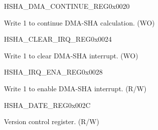 \begin{register}{H}{SHA\_DMA\_CONTINUE\_REG}{0x0020}\label{regdesc:SHADMACONTINUEREG}
%
%
\regnewline%
\begin{regdesc}\begin{reglist}
\label{fielddesc:SHADMACONTINUE}\item [SHA\_DMA\_CONTINUE] Write 1 to continue DMA-SHA calculation. (WO)
\end{reglist}\end{regdesc}
\end{register}


\begin{register}{H}{SHA\_CLEAR\_IRQ\_REG}{0x0024}\label{regdesc:SHACLEARIRQREG}
%
%
\regnewline%
\begin{regdesc}\begin{reglist}
\label{fielddesc:SHACLEARINTERRUPT}\item [SHA\_CLEAR\_INTERRUPT] Write 1 to clear DMA-SHA interrupt. (WO)
\end{reglist}\end{regdesc}
\end{register}


\begin{register}{H}{SHA\_IRQ\_ENA\_REG}{0x0028}\label{regdesc:SHAIRQENAREG}
%
%
\regnewline%
\begin{regdesc}\begin{reglist}
\label{fielddesc:SHAINTERRUPTENA}\item [SHA\_INTERRUPT\_ENA] Write 1 to enable DMA-SHA interrupt. (R/W)
\end{reglist}\end{regdesc}
\end{register}


\begin{register}{H}{SHA\_DATE\_REG}{0x002C}\label{regdesc:SHADATEREG}
%
%
\regnewline%
\begin{regdesc}\begin{reglist}
\label{fielddesc:SHADATE}\item [SHA\_DATE] Version control register. (R/W)
\end{reglist}\end{regdesc}
\end{register}


